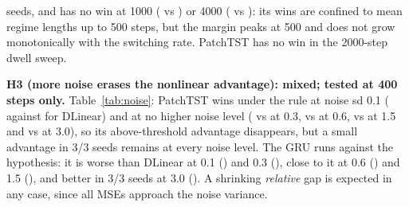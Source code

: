 seeds, and has no win at 1000 ( vs ) or 4000 ( vs ): its wins are confined to mean regime lengths up to 500 steps, but the margin peaks at 500 and does not grow monotonically with the switching rate. PatchTST has no win in the 2000-step dwell sweep.

\textbf{H3 (more noise erases the nonlinear advantage): mixed; tested at 400 steps only.} Table~\ref{tab:noise}: PatchTST wins under the rule at noise sd 0.1 ( against  for DLinear) and at no higher noise level ( vs  at 0.3,  vs  at 0.6,  vs  at 1.5 and  vs  at 3.0), so its above-threshold advantage disappears, but a small advantage in 3/3 seeds remains at every noise level. The GRU runs against the hypothesis: it is worse than DLinear at 0.1 () and 0.3 (), close to it at 0.6 () and 1.5 (), and better in 3/3 seeds at 3.0 (). A shrinking \emph{relative} gap is expected in any case, since all MSEs approach the noise variance.

